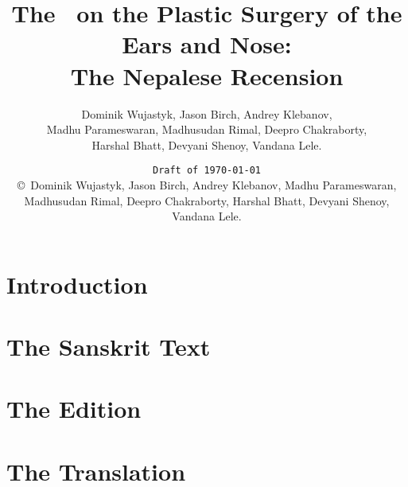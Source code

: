 \documentclass[12pt,draft]{article} %
\title{The \SS\ on the Plastic Surgery of the Ears and Nose:\\ The Nepalese 
Recension}
\author{Dominik Wujastyk, 
Jason Birch,
Andrey Klebanov, \\
Madhu Parameswaran,
Madhusudan Rimal, 
Deepro Chakraborty,\\
Harshal Bhatt, 
Devyani Shenoy,
Vandana Lele.}
\date{\texttt{Draft of \today}\\ \copyright\     \small{Dominik Wujastyk, 
Jason Birch,
Andrey Klebanov, 
Madhu Parameswaran,
Madhusudan Rimal, 
Deepro Chakraborty,
Harshal Bhatt, 
Devyani Shenoy,
Vandana Lele.}}
\begin{document}
 
    
    
    \pagecolor{cyan}
  
    \maketitle
    \pagecolor{white}
%     
    \tableofcontents
\newpage
    \section{Introduction}
    \section{The Sanskrit Text}
\newpage
    \section{The Edition}
\newpage
    \section{The Translation}
\newpage
%    
    
    
\end{document}
